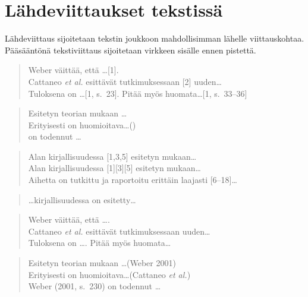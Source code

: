 \documentclass[globalnumbering,centeredcaptions,draftfooter]{tutthesis/tutthesis} %
\newif\ifnameyear
\begin{document}
\section{Lähdeviittaukset tekstissä}

Lähdeviittaus sijoitetaan tekstin joukkoon mahdollisimman lähelle viittauskohtaa.
Pääsääntönä tekstiviittaus sijoitetaan virkkeen sisälle ennen pistettä.

\ifnameyear
  \begin{quotation}
  Weber väittää, että \ldots [1].\\
  Cattaneo \emph{et al.} esittävät tutkimuksessaan [2] uuden\ldots\\
  Tuloksena on \ldots [1, s.~23]. Pitää myös huomata\ldots [1, s.~33--36]
  \end{quotation}

  \begin{quotation}
  Esitetyn teorian mukaan \ldots \citep{Weber2001}\\
  Erityisesti on huomioitava\ldots (\citeauthor{Cattaneo2004})\\
  \citet[s.~230]{Weber2001} on todennut \ldots
  \end{quotation}
    
  \begin{quotation}
  Alan kirjallisuudessa [1,3,5] esitetyn mukaan\ldots\\
  Alan kirjallisuudessa [1][3][5] esitetyn mukaan\ldots\\
  Aihetta on tutkittu ja raportoitu erittäin laajasti [6--18]\ldots
  \end{quotation}
    
  \begin{quotation}
  \ldots kirjallisuudessa \citep{Weber2001,Kaunisto2003,Cattaneo2004} on esitetty\ldots
  \end{quotation}
\else
  \begin{quotation}
  Weber väittää, että \ldots \cite{Weber2001}.\\
  Cattaneo \emph{et al.} esittävät tutkimuksessaan \cite{Cattaneo2004} uuden\ldots\\
  Tuloksena on \ldots \cite[s.~23]{Weber2001}. Pitää myös huomata\ldots \cite[s.~33--36]{Weber2001}
  \end{quotation}

  \begin{quotation}
  Esitetyn teorian mukaan \ldots (Weber 2001)\\
  Erityisesti on huomioitava\ldots (Cattaneo \emph{et al.})\\
  Weber (2001, s.~230) on todennut \ldots
  \end{quotation}
    
\end{document}
